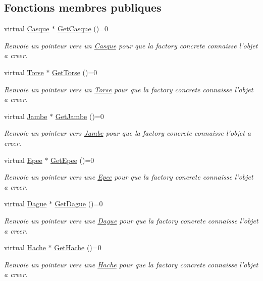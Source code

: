 \subsection*{Fonctions membres publiques}
\begin{DoxyCompactItemize}
\item 
virtual \hyperlink{class_casque}{Casque} $\ast$ \hyperlink{class_item_factory_a89450cf0176a8da74cc5a9b8ef5aaae6}{Get\-Casque} ()=0
\begin{DoxyCompactList}\small\item\em Renvoie un pointeur vers un \hyperlink{class_casque}{Casque} pour que la factory concrete connaisse l'objet a creer. \end{DoxyCompactList}\item 
virtual \hyperlink{class_torse}{Torse} $\ast$ \hyperlink{class_item_factory_ad5f3eb7dffeed5577e05e859775af3dd}{Get\-Torse} ()=0
\begin{DoxyCompactList}\small\item\em Renvoie un pointeur vers un \hyperlink{class_torse}{Torse} pour que la factory concrete connaisse l'objet a creer. \end{DoxyCompactList}\item 
virtual \hyperlink{class_jambe}{Jambe} $\ast$ \hyperlink{class_item_factory_a0a9cc8a72f93f260a61d393d8fb76012}{Get\-Jambe} ()=0
\begin{DoxyCompactList}\small\item\em Renvoie un pointeur vers \hyperlink{class_jambe}{Jambe} pour que la factory concrete connaisse l'objet a creer. \end{DoxyCompactList}\item 
virtual \hyperlink{class_epee}{Epee} $\ast$ \hyperlink{class_item_factory_a8a413e61bf23ad24a549382e4e4e396f}{Get\-Epee} ()=0
\begin{DoxyCompactList}\small\item\em Renvoie un pointeur vers une \hyperlink{class_epee}{Epee} pour que la factory concrete connaisse l'objet a creer. \end{DoxyCompactList}\item 
virtual \hyperlink{class_dague}{Dague} $\ast$ \hyperlink{class_item_factory_a65ed7c9978011812487e6b12b4155fbd}{Get\-Dague} ()=0
\begin{DoxyCompactList}\small\item\em Renvoie un pointeur vers une \hyperlink{class_dague}{Dague} pour que la factory concrete connaisse l'objet a creer. \end{DoxyCompactList}\item 
virtual \hyperlink{class_hache}{Hache} $\ast$ \hyperlink{class_item_factory_afd402df71468d0a96ea12e92c80a185e}{Get\-Hache} ()=0
\begin{DoxyCompactList}\small\item\em Renvoie un pointeur vers une \hyperlink{class_hache}{Hache} pour que la factory concrete connaisse l'objet a creer. \end{DoxyCompactList}\end{DoxyCompactItemize}
